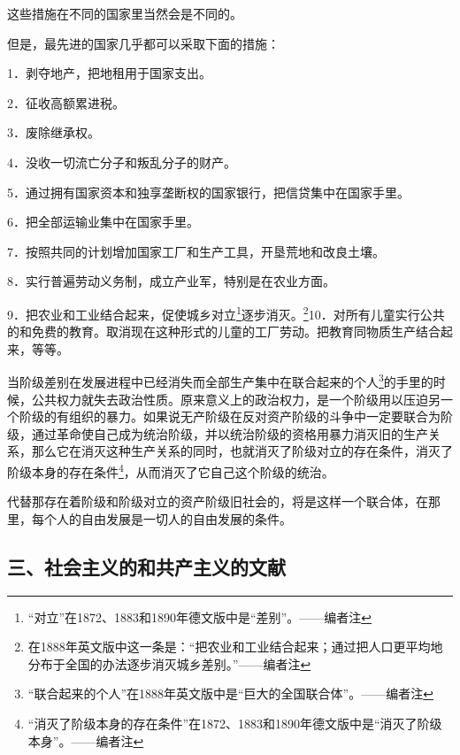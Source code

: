 \documentclass[UTF8,zihao=-4,a4paper]{ctexart}
\begin{document}
这些措施在不同的国家里当然会是不同的。\par
但是，最先进的国家几乎都可以采取下面的措施：\par
1．剥夺地产，把地租用于国家支出。\par
2．征收高额累进税。\par
3．废除继承权。\par
4．没收一切流亡分子和叛乱分子的财产。\par
5．通过拥有国家资本和独享垄断权的国家银行，把信贷集中在国家手里。\par
6．把全部运输业集中在国家手里。\par
7．按照共同的计划增加国家工厂和生产工具，开垦荒地和改良土壤。\par
8．实行普遍劳动义务制，成立产业军，特别是在农业方面。\par
9．把农业和工业结合起来，促使城乡对立\footnote{“对立”在1872、1883和1890年德文版中是“差别”。——编者注}逐步消灭。\footnote{在1888年英文版中这一条是：“把农业和工业结合起来；通过把人口更平均地分布于全国的办法逐步消灭城乡差别。”——编者注}10．对所有儿童实行公共的和免费的教育。取消现在这种形式的儿童的工厂劳动。把教育同物质生产结合起来，等等。\par
当阶级差别在发展进程中已经消失而全部生产集中在联合起来的个人\footnote{“联合起来的个人”在1888年英文版中是“巨大的全国联合体”。——编者注}的手里的时候，公共权力就失去政治性质。原来意义上的政治权力，是一个阶级用以压迫另一个阶级的有组织的暴力。如果说无产阶级在反对资产阶级的斗争中一定要联合为阶级，通过革命使自己成为统治阶级，并以统治阶级的资格用暴力消灭旧的生产关系，那么它在消灭这种生产关系的同时，也就消灭了阶级对立的存在条件，消灭了阶级本身的存在条件\footnote{“消灭了阶级本身的存在条件”在1872、1883和1890年德文版中是“消灭了阶级本身”。——编者注}，从而消灭了它自己这个阶级的统治。\par
代替那存在着阶级和阶级对立的资产阶级旧社会的，将是这样一个联合体，在那里，每个人的自由发展是一切人的自由发展的条件。\par
\subsection*{三、社会主义的和共产主义的文献}
\end{document}
